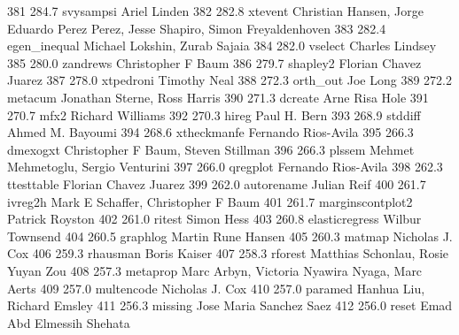    381    284.7    svysampsi     Ariel Linden                            
   382    282.8    xtevent       Christian Hansen, Jorge Eduardo Perez   
                                   Perez, Jesse Shapiro, Simon             
                                   Freyaldenhoven                          
   383    282.4    egen_inequal  Michael Lokshin, Zurab Sajaia           
   384    282.0    vselect       Charles Lindsey                         
   385    280.0    zandrews      Christopher F Baum                      
   386    279.7    shapley2      Florian Chavez Juarez                   
   387    278.0    xtpedroni     Timothy Neal                            
   388    272.3    orth_out      Joe Long                                
   389    272.2    metacum       Jonathan Sterne, Ross Harris            
   390    271.3    dcreate       Arne Risa Hole                          
   391    270.7    mfx2          Richard Williams                        
   392    270.3    hireg         Paul H. Bern                            
   393    268.9    stddiff       Ahmed M. Bayoumi                        
   394    268.6    xtheckmanfe   Fernando Rios-Avila                     
   395    266.3    dmexogxt      Christopher F Baum, Steven Stillman     
   396    266.3    plssem        Mehmet Mehmetoglu, Sergio Venturini     
   397    266.0    qregplot      Fernando Rios-Avila                     
   398    262.3    ttesttable    Florian Chavez Juarez                   
   399    262.0    autorename    Julian Reif                             
   400    261.7    ivreg2h       Mark E Schaffer, Christopher F Baum     
   401    261.7    marginscontplot2  Patrick Royston                         
   402    261.0    ritest        Simon Hess                              
   403    260.8    elasticregress  Wilbur Townsend                         
   404    260.5    graphlog      Martin Rune Hansen                      
   405    260.3    matmap        Nicholas J. Cox                         
   406    259.3    rhausman      Boris Kaiser                            
   407    258.3    rforest       Matthias Schonlau, Rosie Yuyan Zou      
   408    257.3    metaprop      Marc Arbyn, Victoria Nyawira Nyaga,     
                                   Marc Aerts                              
   409    257.0    multencode    Nicholas J. Cox                         
   410    257.0    paramed       Hanhua Liu, Richard Emsley              
   411    256.3    missing       Jose Maria Sanchez Saez                 
   412    256.0    reset         Emad Abd Elmessih Shehata               
